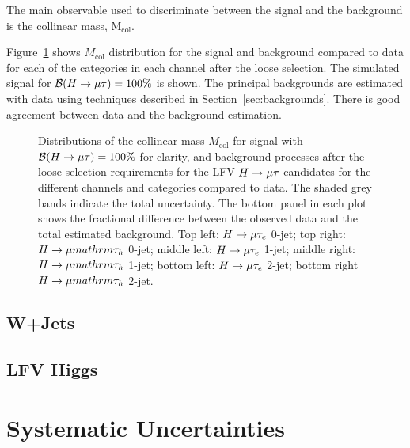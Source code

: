 \documentclass[oneside, letterpaper, oldfontcommands]{memoir}
\begin{document}
{{{The main observable used to discriminate between the signal and the background  is the collinear
mass, $\text{M}_{\text{col}}$.

Figure~\ref{fig:Mcol_after_presel_WITHDATA} shows $M_\text{col}$ distribution for the signal and background compared to data for each of the
categories in each channel after the loose selection. The simulated signal  for $\mathcal{B}(H \rightarrow \mu \mathrm{\tau} )=100\%$ is shown. The principal backgrounds are estimated with data using techniques described in
Section~\ref{sec:backgrounds}.  There is good agreement between data and the background estimation.


\begin{figure}[hbtp]\centering
 \caption{Distributions of the collinear mass $M_\text{col}$ for signal with $\mathcal{B}(H \rightarrow \mu \mathrm{\tau} )=100\%$ for clarity, and background processes after the loose selection requirements for the LFV $H \rightarrow \mu \mathrm{\tau}$ candidates for the different channels and categories compared to data. The shaded grey bands indicate the total uncertainty. The bottom panel in each plot shows the fractional difference between the observed data and the total estimated background.  Top left: $H \rightarrow \mu \mathrm{\tau}_{e}$ 0-jet; top right: $H \rightarrow \mu mathrm{\tau_{h}}$ 0-jet;  middle left: $H \rightarrow \mu \mathrm{\tau}_{e}$ 1-jet; middle right: $H \rightarrow \mu mathrm{\tau_{h}}$
1-jet; bottom left: $H \rightarrow \mu \mathrm{\tau}_{e}$ 2-jet; bottom right $H \rightarrow \mu mathrm{\tau_{h}}$ 2-jet. }
 \label{fig:Mcol_after_presel_WITHDATA}\end{figure}
\subsection{W+Jets}
\subsection{LFV Higgs}
\section{Systematic Uncertainties}
}}}
\end{document}
